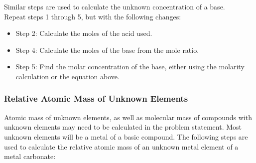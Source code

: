 Similar steps are used to calculate the unknown concentration of a base.\\
Repeat steps 1 through 5, but with the following changes:\\
\begin{itemize}
\item{Step 2: Calculate the moles of the acid used.}
\item{Step 4: Calculate the moles of the base from the mole ratio.}
\item{Step 5: Find the molar concentration of the base, either using the molarity calculation or the equation above.}
\end{itemize}


\subsubsection{Relative Atomic Mass of Unknown Elements}

Atomic mass of unknown elements, as well as molecular mass of compounds with unknown elements may need to be calculated in the problem statement. Most unknown elements will be a metal of a basic compound. The following steps are used to calculate the relative atomic mass of an unknown metal element of a metal carbonate:

